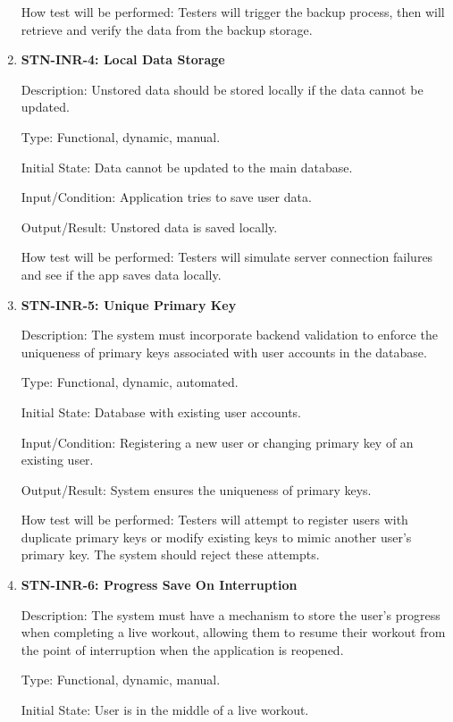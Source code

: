 \documentclass[12pt, titlepage]{article}
\begin{document}
\begin{enumerate}
        How test will be performed: Testers will trigger the backup process, then will retrieve and verify the data from the backup storage.

        \item{\textbf{STN-INR-4: Local Data Storage}}

        Description: Unstored data should be stored locally if the data cannot be updated.

        Type: Functional, dynamic, manual.

        Initial State: Data cannot be updated to the main database.

        Input/Condition: Application tries to save user data.

        Output/Result: Unstored data is saved locally.

        How test will be performed: Testers will simulate server connection failures and see if the app saves data locally.


        \item{\textbf{STN-INR-5: Unique Primary Key}}

        Description: The system must incorporate backend validation to enforce the uniqueness of primary keys associated with user accounts in the database.

        Type: Functional, dynamic, automated.

        Initial State: Database with existing user accounts.

        Input/Condition: Registering a new user or changing primary key of an existing user.

        Output/Result: System ensures the uniqueness of primary keys.

        How test will be performed: Testers will attempt to register users with duplicate primary keys or modify existing keys to mimic another user's primary key. The system should reject these attempts.

        \item{\textbf{STN-INR-6: Progress Save On Interruption}}

        Description: The system must have a mechanism to store the user’s progress when completing a live workout, allowing them to resume their workout from the point of interruption when the application is reopened.

        Type: Functional, dynamic, manual.

        Initial State: User is in the middle of a live workout.


\end{enumerate}
\end{document}
